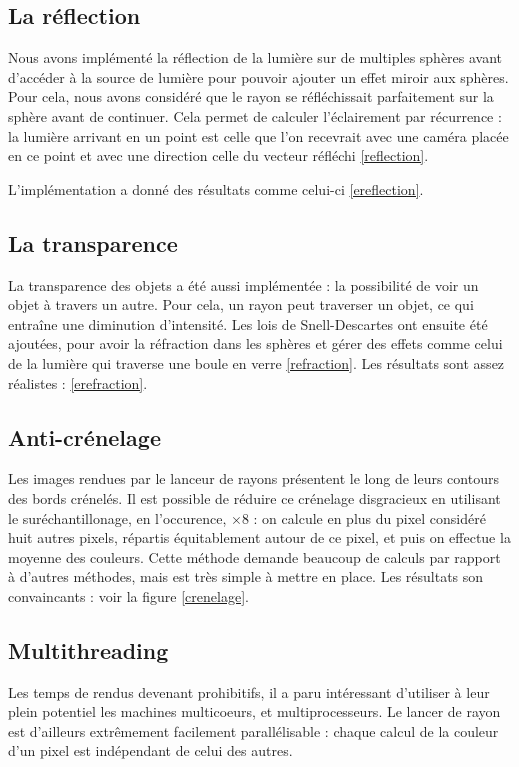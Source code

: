 \subsection{La réflection}
Nous avons implémenté la réflection de la lumière sur de multiples sphères avant d'accéder à la source de lumière pour pouvoir ajouter un effet miroir aux sphères. Pour cela, nous avons considéré que le rayon se réfléchissait parfaitement sur la sphère avant de continuer. Cela permet de calculer l'éclairement par récurrence : la lumière arrivant en un point est celle que l'on recevrait avec une caméra placée en ce point et avec une direction celle du vecteur réfléchi \ref{reflection}.

L'implémentation a donné des résultats comme celui-ci \ref{ereflection}.

\subsection{La transparence}
  La transparence des objets a été aussi implémentée : la possibilité de voir un objet à travers un autre. Pour cela, un rayon peut traverser un objet, ce qui entraîne une diminution d'intensité. Les lois de Snell-Descartes ont ensuite été ajoutées, pour avoir la réfraction dans les sphères et gérer des effets comme celui de la lumière qui traverse une boule en verre \ref{refraction}.
Les résultats sont assez réalistes :  \ref{erefraction}.

\subsection{Anti-crénelage}
  Les images rendues par le lanceur de rayons présentent le long de leurs contours des bords crénelés.
Il est possible de réduire ce crénelage disgracieux en utilisant le suréchantillonage, en l'occurence, $\times 8$ : on calcule en plus 
 du pixel considéré huit autres pixels, répartis équitablement autour de ce pixel, et puis on effectue la moyenne des couleurs.
Cette méthode demande beaucoup de calculs par rapport à d'autres méthodes, mais est très simple à mettre en place.
  Les résultats son convaincants : voir la figure \ref{crenelage}.
 
\subsection{Multithreading}
  Les temps de rendus devenant prohibitifs, il a paru intéressant d'utiliser à leur plein potentiel les machines multicoeurs, et multiprocesseurs.
  Le lancer de rayon est d'ailleurs extrêmement facilement parallélisable : chaque calcul de la couleur d'un pixel est indépendant de celui des 
  autres.
  
